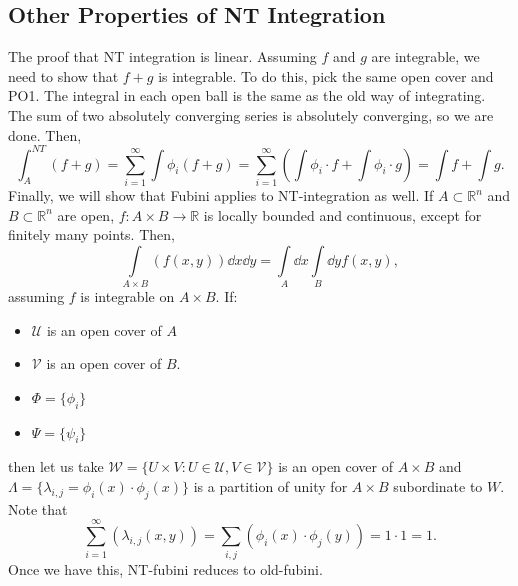 \documentclass{article}
\numberwithin{equation}{section}
\begin{document}
\subsection{Other Properties of NT Integration}
The proof that NT integration is linear. Assuming $f$ and $g$ are integrable, we need to show that $f+g$ is integrable. To do this, pick the same open cover and PO1. The integral in each open ball is the same as the old way of integrating. The sum of two absolutely converging series is absolutely converging, so we are done. Then,
\begin{equation}
    \int_A^{NT} (f+g) = \sum_{i=1}^{\infty} \int \phi_i(f+g) = \sum_{i=1}^{\infty} \left(\int \phi_i \cdot f + \int \phi_i \cdot g\right) = \int f + \int g.
\end{equation}
Finally, we will show that Fubini applies to NT-integration as well. If $A\subset \mathbb{R}^n$ and $B\subset \mathbb{R}^n$ are open, $f:A\times B \to \mathbb{R}$ is locally bounded and continuous, except for finitely many points. Then,
\begin{equation}
    \int\limits_{A\times B} (f(x,y)) \dd{x}\dd{y} = \int\limits_A \dd{x} \int\limits_B \dd{y} f(x,y),
\end{equation}
assuming $f$ is integrable on $A\times B$. If:
\begin{itemize}
    \item $\mathcal{U}$ is an open cover of $A$
    \item $\mathcal{V}$ is an open cover of $B$.
    \item $\Phi = \{\phi_i\}$
    \item $\Psi = \{\psi_i\}$
\end{itemize}
then let us take $\mathcal{W} = \{U\times V: U \in \mathcal{U},V\in\mathcal{V}\}$ is an open cover of $A\times B$ and $\Lambda = \{\lambda_{i,j}=\phi_i(x) \cdot \phi_j(x)\}$ is a partition of unity for $A\times B$ subordinate to $W$. Note that
\begin{equation}
    \sum_{i=1}^{\infty}(\lambda_{i,j}(x,y)) = \sum_{i,j}(\phi_i(x) \cdot \phi_j(y)) = 1\cdot 1 = 1.
\end{equation}
Once we have this, NT-fubini reduces to old-fubini.
\newpage
\end{document}
